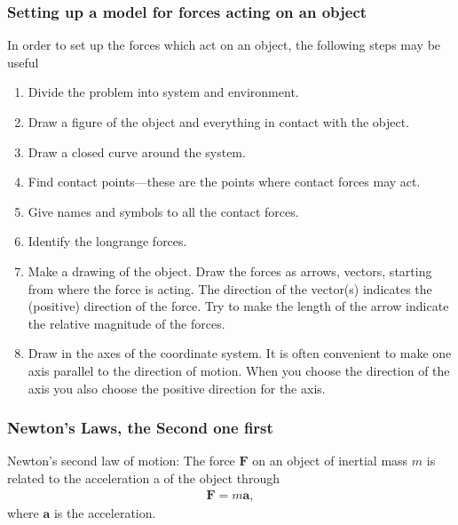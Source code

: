 \documentclass[letterpaper,10pt,english]{sphinxmanual}
\begin{document}
\subsubsection{Setting up a model for forces acting on an object}
\label{\detokenize{chapter3:setting-up-a-model-for-forces-acting-on-an-object}}
In order to set up the forces which act on an object, the following steps may be useful
\begin{enumerate}
%
\item {} 
Divide the problem into system and environment.

\item {} 
Draw a figure of the object and everything in contact with the object.

\item {} 
Draw a closed curve around the system.

\item {} 
Find contact points—these are the points where contact forces may act.

\item {} 
Give names and symbols to all the contact forces.

\item {} 
Identify the long\sphinxhyphen{}range forces.

\item {} 
Make a drawing of the object. Draw the forces as arrows, vectors, starting from where the force is acting. The direction of the vector(s) indicates the (positive) direction of the force. Try to make the length of the arrow indicate the relative magnitude of the forces.

\item {} 
Draw in the axes of the coordinate system. It is often convenient to make one axis parallel to the direction of motion. When you choose the direction of the axis you also choose the positive direction for the axis.

\end{enumerate}


\subsubsection{Newton’s Laws, the Second one first}
\label{\detokenize{chapter3:newton-s-laws-the-second-one-first}}
Newton’s second law of motion: The force \(\boldsymbol{F}\) on an object of inertial mass \(m\)
is related to the acceleration a of the object through
\begin{equation*}
\begin{split}
\boldsymbol{F} = m\boldsymbol{a},
\end{split}
\end{equation*}
where \(\boldsymbol{a}\) is the acceleration.
\end{document}
